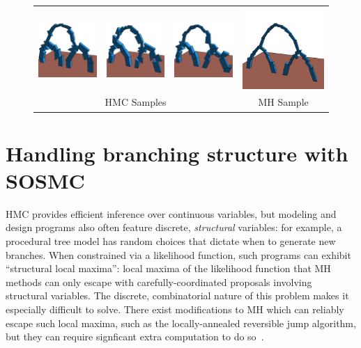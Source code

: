 \documentclass[
10pt, %
a4paper, %
oneside, %
headinclude,footinclude, %
BCOR5mm, %
]{scrartcl}
\newcommand*{\helvetica}{\fontfamily{phv}\selectfont}
\begin{document}
\vspace{1em}
\begin{figure}[h!]
	\centering
	\begin{tabular}{ccc|c}
		\includegraphics[width=0.23\linewidth]{figs/hmc/hmc_1.png} &
		\includegraphics[width=0.23\linewidth]{figs/hmc/hmc_2.png} &
		\includegraphics[width=0.23\linewidth]{figs/hmc/hmc_3.png} &
		\includegraphics[width=0.23\linewidth]{figs/hmc/mh.png} \\
		\multicolumn{3}{c}{{\helvetica \scriptsize{HMC Samples}}} & {\helvetica \scriptsize{MH Sample}}
	\end{tabular}
\end{figure}



\section*{Handling branching structure with SOSMC}

HMC provides efficient inference over continuous variables, but modeling and design programs also often feature discrete, \emph{structural} variables: for example, a procedural tree model has random choices that dictate when to generate new branches. When constrained via a likelihood function, such programs can exhibit ``structural local maxima'': local maxima of the likelihood function that MH methods can only escape with carefully-coordinated proposals involving structural variables. The discrete, combinatorial nature of this problem makes it especially difficult to solve. There exist modifications to MH which can reliably escape such local maxima, such as the locally-annealed reversible jump algorithm, but they can require signficant extra computation to do so~\cite{LARJ}. 
\end{document}
